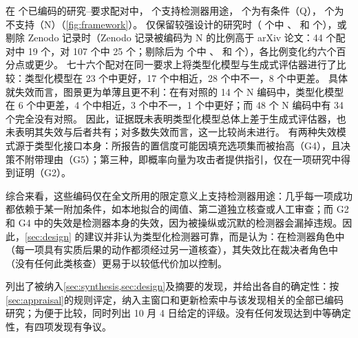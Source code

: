 在 \nRows{} 个已编码的研究--要求配对中，\nS{} 个支持检测器用途，\nQ{} 个为有条件（Q），\nN{} 个为不支持（N）（\cref{fig:framework}）。
仅保留较强设计的研究时（\nStrongRows{} 个中 \nStrongS{}、\nStrongQ{} 和 \nStrongN{} 个），或剔除 Zenodo 记录时（Zenodo 记录被编码为 N 的比例高于 arXiv 论文：44 个配对中 19 个，对 107 个中 25 个；剔除后为 \nNoZenRows{} 个中 \nNoZenS{}、\nNoZenQ{} 和 \nNoZenN{} 个），各比例变化约六个百分点或更少。
七十六个配对在同一要求上将类型化模型与生成式评估器进行了比较：类型化模型在 23 个中更好，17 个中相近，28 个中不一，8 个中更差。
具体就失效而言，图景更为单薄且更不利：在有对照的 14 个 N 编码中，类型化模型在 6 个中更差，4 个中相近，3 个中不一，1 个中更好；而 48 个 N 编码中有 34 个完全没有对照。
因此，证据既未表明类型化模型总体上差于生成式评估器，也未表明其失效与后者共有；对多数失效而言，这一比较尚未进行。
有两种失效模式源于类型化接口本身：所报告的置信度可能因填充选项集而被抬高（G4），且决策不附带理由（G5）；第三种，即概率向量为攻击者提供指引，仅在一项研究中得到证明（G2）。

综合来看，这些编码仅在全文所用的限定意义上支持检测器用途：几乎每一项成功都依赖于某一附加条件，如本地拟合的阈值、第二道独立核查或人工审查；而 G2 和 G4 中的失效是检测器本身的失效，因为被操纵或沉默的检测器会漏掉违规。因此，\cref{sec:design} 的建议并非认为类型化检测器可靠，而是认为：在检测器角色中（每一项具有实质后果的动作都须经过另一道核查），其失效比在裁决者角色中（没有任何此类核查）更易于以较低代价加以控制。

 列出了被纳入\cref{sec:synthesis,sec:design}及摘要的发现，并给出各自的确定性：按\cref{sec:appraisal}的规则评定，纳入主窗口和更新检索中与该发现相关的全部已编码研究；为便于比较，同时列出 10 月 4 日给定的评级。没有任何发现达到中等确定性，有四项发现有争议。

